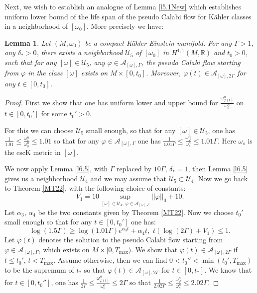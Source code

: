 \documentclass[11pt]{amsart}
\newtheorem{lem}{Lemma}[section]
\numberwithin{equation}{section}
\newcommand{\bR}{ \mathbb{R}} %
\begin{document}
Next,  we wish to establish an analogue of Lemma \ref{l5.1New} which establishes uniform lower bound of the life span of the pseudo Calabi flow for K\"ahler classes in a neighborhood of $[\omega_0]$.  More precisely we have:
\begin{lem}\label{l6.6}
Let $(M,\omega_0)$ be a compact K\"ahler-Einstein manifold.  For any $\Gamma>1$,  any $\delta_*>0$,  there exists a neighborhood $\mathcal{U}_5$ of $[\omega_0]$ in $H^{1,1}(M,\bR)$ and $t_0>0$,  such that for any $[\omega]\in \mathcal{U}_5$,  any $\varphi\in\mathcal{A}_{[\omega],\Gamma}$,  the pseudo Calabi flow starting from $\varphi$ in the class $[\omega]$ exists on $M\times [0,t_0]$.  Moreover,  $\varphi(t)\in \mathcal{A}_{[\omega],2\Gamma}$ for any $t\in [0,t_0]$.
\end{lem}
\begin{proof}
First we show that one has uniform lower and upper bound for $\frac{\omega_{\varphi(t)}^n}{\omega_0^n}$ on $t\in [0,t_0']$ for some $t_0'>0$.

For this we can choose $\mathcal{U}_5$ small enough,  so that for any $[\omega]\in \mathcal{U}_5$,  one has $\frac{1}{1.01}\le \frac{\omega_s^n}{\omega_0^n}\le 1.01$ so that for any $\varphi\in \mathcal{A}_{[\omega],\Gamma}$ one has 
$\frac{1}{1.01\Gamma}\le \frac{\omega_{\varphi}^n}{\omega_s^n}\le 1.01\Gamma$.  Here $\omega_s$ is the cscK metric in $[\omega]$.

We now apply Lemma \ref{l6.5},  with $\Gamma$ replaced by $10\Gamma$,  $\delta_*=1$,  then Lemma \ref{l6.5} gives us a neighborhood $\mathcal{U}_4$ and we may assume that $\mathcal{U}_5\subset \mathcal{U}_4$.  Now we go back to Theorem \ref{MT22},  with the following choice of constants:
\begin{equation*}
V_1=10\sup_{[\omega]\in \mathcal{U}_4,\,\varphi\in\mathcal{A}_{[\omega],\Gamma}}||\varphi||_0+10.
\end{equation*}
Let $\alpha_3,\,\alpha_4$ be the two constants given by Theorem \ref{MT22}.  Now we choose $t_0'$ small enough so that for any $t\in [0,t_0']$ one has:
\begin{equation*}
\log(1.5\Gamma)\ge \log(1.01\Gamma)e^{\alpha_3t}+\alpha_4t,\,\,t(\log(2\Gamma)+V_1)\le 1.
\end{equation*}
Let $\varphi(t)$ denotes the solution to the pseudo Calabi flow starting from $\varphi\in\mathcal{A}_{[\omega],\Gamma}$,  which exists on $M\times [0,T_{\max})$.  We show that $\varphi(t)\in \mathcal{A}_{[\omega],2\Gamma}$ if $t\le t_0',\,t<T_{\max}$.  Assume otherwise,  then we can find $0<t_0''<\min(t_0',T_{\max})$ to be the supremum of $t_*$ so that $\varphi(t)\in \mathcal{A}_{[\omega],2\Gamma}$ for $t\in [0,t_*]$.  We know that for $t\in [0,t_0'']$,  one has $\frac{1}{2\Gamma}\le \frac{\omega_{\varphi(t)}^n}{\omega_0^n}\le 2\Gamma$ so that $\frac{1}{2.02\Gamma}\le \frac{\omega_{\varphi}^n}{\omega_s^n}\le 2.02\Gamma$.


\end{proof}
\end{document}

